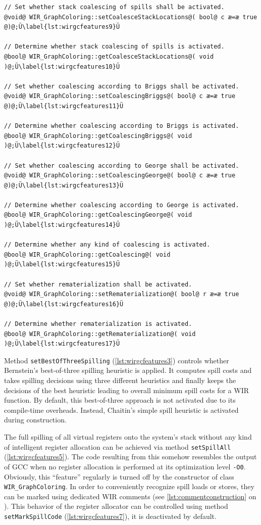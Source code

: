 \begin{lstlisting}[style=code,float=!t,caption={Feature Activation of Class \texttt{WIR\_GraphColoring}},label=lst:wirgcfeatures]
// Set whether stack coalescing of spills shall be activated.
@void@ WIR_GraphColoring::setCoalesceStackLocations@( bool@ c æ=æ true @)@;Ü\label{lst:wirgcfeatures9}Ü

// Determine whether stack coalescing of spills is activated.
@bool@ WIR_GraphColoring::getCoalesceStackLocations@( void )@;Ü\label{lst:wirgcfeatures10}Ü

// Set whether coalescing according to Briggs shall be activated.
@void@ WIR_GraphColoring::setCoalescingBriggs@( bool@ c æ=æ true @)@;Ü\label{lst:wirgcfeatures11}Ü

// Determine whether coalescing according to Briggs is activated.
@bool@ WIR_GraphColoring::getCoalescingBriggs@( void )@;Ü\label{lst:wirgcfeatures12}Ü

// Set whether coalescing according to George shall be activated.
@void@ WIR_GraphColoring::setCoalescingGeorge@( bool@ c æ=æ true @)@;Ü\label{lst:wirgcfeatures13}Ü

// Determine whether coalescing according to George is activated.
@bool@ WIR_GraphColoring::getCoalescingGeorge@( void )@;Ü\label{lst:wirgcfeatures14}Ü

// Determine whether any kind of coalescing is activated.
@bool@ WIR_GraphColoring::getCoalescing@( void )@;Ü\label{lst:wirgcfeatures15}Ü

// Set whether rematerialization shall be activated.
@void@ WIR_GraphColoring::setRematerialization@( bool@ r æ=æ true @)@;Ü\label{lst:wirgcfeatures16}Ü

// Determine whether rematerialization is activated.
@bool@ WIR_GraphColoring::getRematerialization@( void )@;Ü\label{lst:wirgcfeatures17}Ü
\end{lstlisting}

Method \texttt{setBestOfThreeSpilling} (\cref{lst:wirgcfeatures3}) controls whether Bernstein's best-of-three spilling heuristic is applied.
It computes spill costs and takes spilling decisions using three different heuristics and finally keeps the decisions of the best heuristic leading to overall minimum spill costs for a \gls{WIR} function.
By default, this best-of-three approach is not activated due to its compile-time overheads.
Instead, Chaitin's simple spill heuristic is activated during construction.

The full spilling of all virtual registers onto the system's stack without any kind of intelligent register allocation can be achieved via method \texttt{setSpillAll} (\cref{lst:wirgcfeatures5}).
The code resulting from this somehow resembles the output of \gls{GCC} when no register allocation is performed at its optimization level \texttt{-O0}.
Obviously, this ``feature'' regularly is turned off by the constructor of class \texttt{WIR\_GraphColoring}.
In order to conveniently recognize spill loads or stores, they can be marked using dedicated \gls{WIR} comments (see \cref{lst:commentconstruction} on ).
This behavior of the register allocator can be controlled using method \texttt{setMarkSpillCode} (\cref{lst:wirgcfeatures7}), it is deactivated by default.

